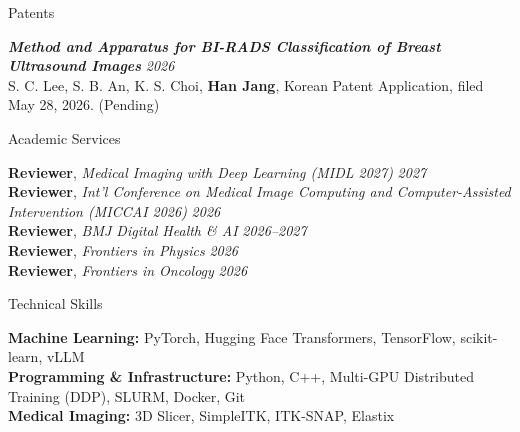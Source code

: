 \documentclass{resume}
\begin{document}
\begin{rSection}{Patents}

\textbf{\textit{Method and Apparatus for BI-RADS Classification of Breast Ultrasound Images}}%
\hfill \textit{2026} \\
\hspace*{1em} S. C. Lee, S. B. An, K. S. Choi, \textbf{Han Jang}, Korean Patent Application, filed May 28, 2026. (Pending)

\end{rSection}

\begin{rSection}{Academic Services}

\textbf{Reviewer}, \textit{Medical Imaging with Deep Learning (MIDL 2027)} \hfill \textit{2027}
\\[0.6em]
\textbf{Reviewer}, \textit{Int'l Conference on Medical Image Computing and Computer-Assisted Intervention (MICCAI 2026)} \hfill \textit{2026}
\\[0.6em]
\textbf{Reviewer}, \textit{BMJ Digital Health \& AI} \hfill \textit{2026--2027}
\\[0.6em]
\textbf{Reviewer}, \textit{Frontiers in Physics} \hfill \textit{2026}
\\[0.6em]
\textbf{Reviewer}, \textit{Frontiers in Oncology} \hfill \textit{2026}

\end{rSection}

\begin{rSection}{Technical Skills}

\textbf{Machine Learning:} PyTorch, Hugging Face Transformers, TensorFlow, scikit-learn, vLLM
\\[0.3em]
\textbf{Programming \& Infrastructure:} Python, C++, Multi-GPU Distributed Training (DDP), SLURM, Docker, Git
\\[0.3em]
\textbf{Medical Imaging:} 3D Slicer, SimpleITK, ITK-SNAP, Elastix

\end{rSection}
\end{document}
